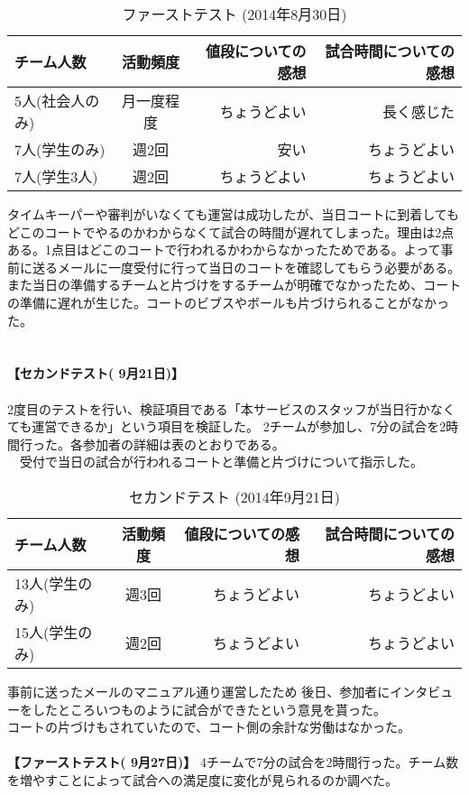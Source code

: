 \begin{table}[htb]
	\begin{center}
		\caption{ファーストテスト (2014年8月30日)}
		\begin{tabular}{|l|c|r||r|} \hline
			チーム人数 & 活動頻度 & 値段についての感想 & 試合時間についての感想 \\ \hline \hline
			5人(社会人のみ) & 月一度程度 & ちょうどよい & 長く感じた \\
			7人(学生のみ) & 週2回 & 安い & ちょうどよい \\
			7人(学生3人) & 週2回 & ちょうどよい & ちょうどよい \\ \hline
		\end{tabular}
		\label{tab:price}
	\end{center}
\end{table}

タイムキーパーや審判がいなくても運営は成功したが、当日コートに到着してもどこのコートでやるのかわからなくて試合の時間が遅れてしまった。理由は2点ある。1点目はどこのコートで行われるかわからなかったためである。よって事前に送るメールに一度受付に行って当日のコートを確認してもらう必要がある。また当日の準備するチームと片づけをするチームが明確でなかったため、コートの準備に遅れが生じた。コートのビブスやボールも片づけられることがなかった。
\\
\\
\\\textbf{【セカンドテスト( 9月21日)】}
\\
\\
2度目のテストを行い、検証項目である「本サービスのスタッフが当日行かなくても運営できるか」という項目を検証した。
2チームが参加し、7分の試合を2時間行った。各参加者の詳細は表のとおりである。
\\　受付で当日の試合が行われるコートと準備と片づけについて指示した。

\begin{table}[htb]
	\begin{center}
		\caption{セカンドテスト (2014年9月21日)}
		\begin{tabular}{|l|c|r||r|} \hline
			チーム人数 & 活動頻度 & 値段についての感想 & 試合時間についての感想 \\ \hline \hline
			13人(学生のみ) & 週3回 & ちょうどよい & ちょうどよい \\
			15人(学生のみ) & 週2回 & ちょうどよい & ちょうどよい \\ \hline
		\end{tabular}
		\label{tab:price}
	\end{center}
\end{table}
事前に送ったメールのマニュアル通り運営したため
後日、参加者にインタビューをしたところいつものように試合ができたという意見を貰った。
\\コートの片づけもされていたので、コート側の余計な労働はなかった。
\\
\\\textbf{【ファーストテスト( 9月27日)】}
4チームで7分の試合を2時間行った。チーム数を増やすことによって試合への満足度に変化が見られるのか調べた。

